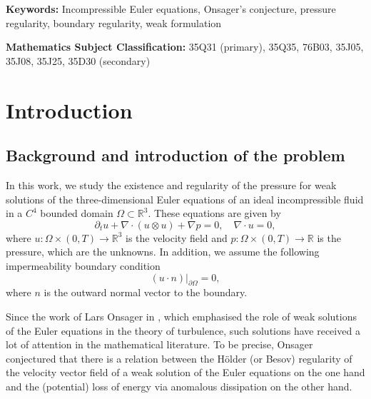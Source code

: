 \documentclass[12pt,a4paper]{article}
\theoremstyle{definition}
\theoremstyle{remark}
\numberwithin{equation}{section}
\begin{document}
\noindent \textbf{Keywords:} Incompressible Euler equations, Onsager's conjecture, pressure regularity, boundary regularity, weak formulation

\vspace{0.1cm} \noindent \textbf{Mathematics Subject Classification:} 35Q31 (primary), 35Q35, 76B03, 35J05, 35J08, 35J25, 35D30 (secondary)
	
\bigskip

\tableofcontents

\section{Introduction}
\subsection{Background and introduction of the problem}

In this work, we study the existence and regularity of the pressure for weak solutions of the three-dimensional Euler equations of an ideal incompressible fluid in a $C^4$ bounded domain $\Omega \subset \mathbb{R}^3$. These equations are given by
\begin{equation} \label{eulerequations}
\partial_t u + \nabla \cdot (u \otimes u) + \nabla p = 0, \quad \nabla \cdot u = 0,
\end{equation}
where $u : \Omega \times (0,T) \rightarrow \mathbb{R}^3$ is the velocity field and $p : \Omega \times (0,T) \rightarrow \mathbb{R}$ is the pressure, which are the unknowns. In addition, we assume the following impermeability boundary condition
\begin{equation} \label{velocitybc}
(u \cdot n) \lvert_{\partial \Omega} = 0,
\end{equation}
where $n$ is the outward normal vector to the boundary.

Since the work of Lars Onsager in \cite{onsager}, which emphasised the role of weak solutions of the Euler equations in the theory of turbulence, such solutions have received a lot of attention in the mathematical literature. To be precise, Onsager conjectured that there is a relation between the H\"older (or Besov) regularity of the velocity vector field of a weak solution of the Euler equations on the one hand and the (potential) loss of energy via anomalous dissipation on the other hand. 
\end{document}

